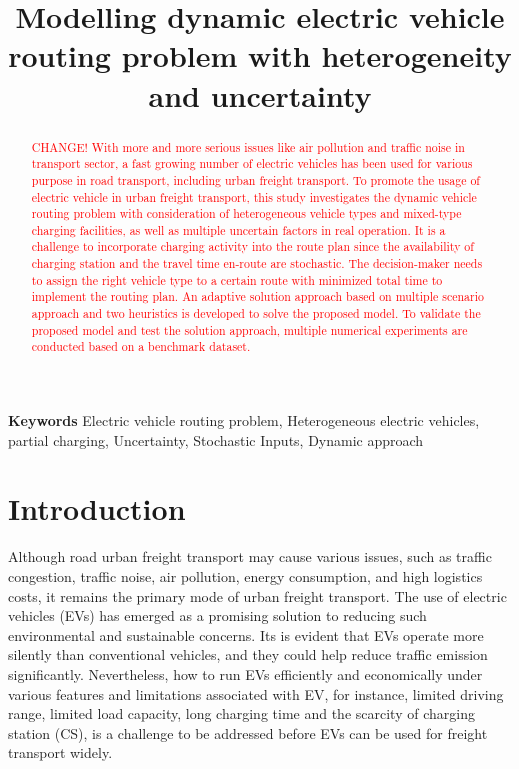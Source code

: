 \documentclass[11pt]{article}
\title{Modelling dynamic electric vehicle routing problem with heterogeneity and uncertainty}
\author{ }
\date{}
\begin{document}

\maketitle

\begin{abstract}
	\textcolor{red}{CHANGE! With more and more serious issues like air pollution and traffic noise in transport sector, a fast growing number of electric vehicles has been used for various purpose in road transport, including urban freight transport. To promote the usage of electric vehicle in urban freight transport, this study investigates the dynamic vehicle routing problem with consideration of heterogeneous vehicle types and mixed-type charging facilities, as well as multiple uncertain factors in real operation. It is a challenge to incorporate charging activity into the route plan since the availability of charging station and the travel time en-route are stochastic. The decision-maker needs to assign the right vehicle type to a certain route with minimized total time to implement the routing plan. An adaptive solution approach based on multiple scenario approach and two heuristics is developed to solve the proposed model. To validate the proposed model and test the solution approach, multiple numerical experiments are conducted based on a benchmark dataset.}
\end{abstract}
\textbf{Keywords} Electric vehicle routing problem, Heterogeneous electric vehicles, partial charging, Uncertainty, Stochastic Inputs, Dynamic approach


\section{Introduction}

Although road urban freight transport may cause various issues, such as traffic congestion, traffic noise, air pollution, energy consumption, and high logistics costs, it remains the primary mode of urban freight transport. The use of electric vehicles (EVs) has emerged as a promising solution to reducing such environmental and sustainable concerns. Its is evident that EVs operate more silently than conventional vehicles, and they could help reduce traffic emission significantly.  Nevertheless, how to run EVs efficiently and economically under various features and limitations associated with EV, for instance, limited driving range, limited load capacity, long charging time and the scarcity of charging station (CS), is a challenge to be addressed before EVs can be used for freight transport widely.
\end{document}
